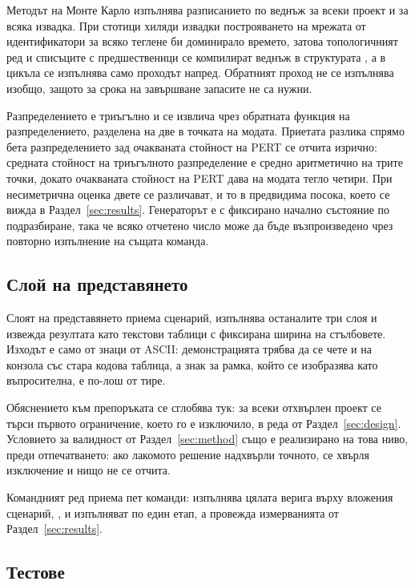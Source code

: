 Методът на Монте Карло изпълнява разписанието по веднъж за всеки проект и за
всяка извадка. При стотици хиляди извадки построяването на мрежата от
идентификатори за всяко теглене би доминирало времето, затова топологичният ред и
списъците с предшественици се компилират веднъж в структурата , а
в цикъла се изпълнява само проходът напред. Обратният проход не се изпълнява
изобщо, защото за срока на завършване запасите не са нужни.

Разпределението е триъгълно и се извлича чрез обратната функция на
разпределението, разделена на две в точката на модата. Приетата разлика спрямо
бета разпределението зад очакваната стойност на PERT се отчита изрично:
средната стойност на триъгълното разпределение е средно аритметично на трите
точки, докато очакваната стойност на PERT дава на модата тегло четири. При
несиметрична оценка двете се различават, и то в предвидима посока, което се вижда
в Раздел~\ref{sec:results}. Генераторът е  с фиксирано
начално състояние по подразбиране, така че всяко отчетено число може да бъде
възпроизведено чрез повторно изпълнение на същата команда.

\subsection{Слой на представянето}

Слоят на представянето приема сценарий, изпълнява останалите три слоя и извежда
резултата като текстови таблици с фиксирана ширина на стълбовете. Изходът е само
от знаци от ASCII: демонстрацията трябва да се чете и на конзола със стара кодова
таблица, а знак за рамка, който се изобразява като въпросителна, е по-лош от
тире.

Обяснението към препоръката се сглобява тук: за всеки отхвърлен проект се търси
първото ограничение, което го е изключило, в реда от Раздел~\ref{sec:design}.
Условието за валидност от Раздел~\ref{sec:method} също е реализирано на това
ниво, преди отпечатването: ако лакомото решение надхвърли точното, се хвърля
изключение и нищо не се отчита.

Командният ред приема пет команди:  изпълнява цялата верига върху
вложения сценарий, ,  и  изпълняват по
един етап, а  провежда измерванията от Раздел~\ref{sec:results}.

\subsection{Тестове}

